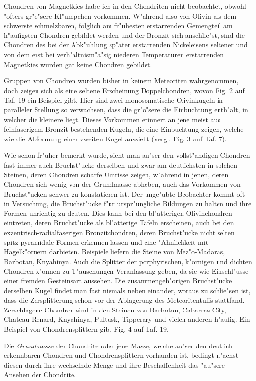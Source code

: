 \documentclass[a4paper, 11pt, oneside, polutonikogreek, german]{article}
\begin{document}
Chondren von Magnetkies habe ich in den Chondriten nicht beobachtet, obwohl "ofters gr"o"sere Kl"umpchen vorkommen. W"ahrend also von Olivin als dem schwerste schmelzbaren, folglich am fr"uhesten erstarrenden Gemengteil am h"aufigsten Chondren gebildet werden und der Bronzit sich anschlie"st, sind die Chondren des bei der Abk"uhlung sp"ater erstarrenden Nickeleisens seltener und von dem erst bei verh"altnism"a"sig niederen Temperaturen erstarrenden Magnetkies wurden gar keine Chondren gebildet.

Gruppen von Chondren wurden bisher in keinem Meteoriten wahrgenommen, doch zeigen sich als eine seltene Erscheinung Doppelchondren, wovon Fig. 2 auf Taf. 19 ein Beispiel gibt. Hier sind zwei monosomatische Olivinkugeln in paralleler Stellung so verwachsen, dass die gr"o"sere die Einbuchtung enth"alt, in welcher die kleinere liegt. Dieses Vorkommen erinnert an jene meist aus feinfaserigem Bronzit bestehenden Kugeln, die eine Einbuchtung zeigen, welche wie die Abformung einer zweiten Kugel aussieht (vergl. Fig. 3 auf Taf. 7).

Wie schon fr"uher bemerkt wurde, sieht man au"ser den vollst"andigen Chondren fast immer auch Bruchst"ucke derselben und zwar am deutlichsten in solchen Steinen, deren Chondren scharfe Umrisse zeigen, w"ahrend in jenen, deren Chondren sich wenig von der Grundmasse abheben, auch das Vorkommen von Bruchst"ucken schwer zu konstatieren ist. Der unge"ubte Beobachter kommt oft in Versuchung, die Bruchst"ucke f"ur urspr"ungliche Bildungen zu halten und ihre Formen unrichtig zu deuten. Dies kann bei den bl"atterigen Olivinchondren eintreten, deren Bruchst"ucke als bl"atterige Tafeln erscheinen, auch bei den exzentrisch-radialfaserigen Bronzitchondren, deren Bruchst"ucke nicht selten spitz-pyramidale Formen erkennen lassen und eine "Ahnlichkeit mit Hagelk"ornern darbieten. Beispiele liefern die Steine von Mez"o-Madaras, Barbotan, Knyahinya. Auch die Splitter der porphyrischen, k"ornigen und dichten Chondren k"onnen zu T"auschungen Veranlassung geben, da sie wie Einschl"usse einer fremden Gesteinsart aussehen. Die zusammengeh"origen Bruchst"ucke derselben Kugel findet man fast niemals neben einander, woraus zu schlie"sen ist, dass die Zersplitterung schon vor der Ablagerung des Meteoritentuffs stattfand. Zerschlagene Chondren sind in den Steinen von Barbotan, Cabarras City, Chateau Renard, Knyahinya, Pultusk, Tipperary und vielen anderen h"aufig. Ein Beispiel von Chondrensplittern gibt Fig. 4 auf Taf. 19.

Die \emph{Grundmasse} der Chondrite oder jene Masse, welche au"ser den deutlich erkennbaren Chondren und Chondrensplittern vorhanden ist, bedingt n"achst diesen durch ihre wechselnde Menge und ihre Beschaffenheit das "au"sere Ansehen der Chondrite.
\end{document}
